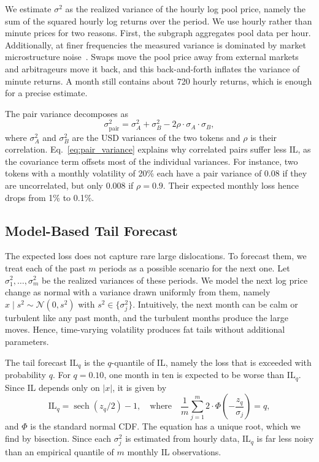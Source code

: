 \documentclass[10pt,conference,compsocconf]{IEEEtran}
\begin{document}
We estimate $\sigma^2$ as the realized variance of the hourly log pool price, namely the sum of the squared hourly log returns over the period. We use hourly rather than minute prices for two reasons. First, the subgraph aggregates pool data per hour. Additionally, at finer frequencies the measured variance is dominated by market microstructure noise~\cite{ait2005often}. Swaps move the pool price away from external markets and arbitrageurs move it back, and this back-and-forth inflates the variance of minute returns. A month still contains about 720 hourly returns, which is enough for a precise estimate.

The pair variance decomposes as
\begin{equation}
\label{eq:pair_variance}
\sigma^2_{\text{pair}} = \sigma_A^2 + \sigma_B^2 - 2\rho\cdot\sigma_A\cdot\sigma_B,
\end{equation}
where $\sigma_A^2$ and $\sigma_B^2$ are the USD variances of the two tokens and $\rho$ is their correlation. Eq.~\eqref{eq:pair_variance} explains why correlated pairs suffer less IL, as the covariance term offsets most of the individual variances. For instance, two tokens with a monthly volatility of 20\% each have a pair variance of 0.08 if they are uncorrelated, but only 0.008 if $\rho=0.9$. Their expected monthly loss hence drops from 1\% to 0.1\%.

\subsection{Model-Based Tail Forecast}
\label{subsec:model_tail}
The expected loss does not capture rare large dislocations. To forecast them, we treat each of the past $m$ periods as a possible scenario for the next one. Let $\sigma^2_1,\dots,\sigma^2_m$ be the realized variances of these periods. We model the next log price change as normal with a variance drawn uniformly from them, namely $x\mid s^2 \sim \mathcal{N}(0,s^2)$ with $s^2\in\{\sigma^2_j\}$. Intuitively, the next month can be calm or turbulent like any past month, and the turbulent months produce the large moves. Hence, time-varying volatility produces fat tails without additional parameters.

The tail forecast $\mathrm{IL}_q$ is the $q$-quantile of IL, namely the loss that is exceeded with probability $q$. For $q=0.10$, one month in ten is expected to be worse than $\mathrm{IL}_q$. Since IL depends only on $|x|$, it is given by
\begin{equation}
\label{eq:model_tail}
\mathrm{IL}_q = \operatorname{sech}(z_q/2)-1, \quad \text{where} \quad
\frac{1}{m}\sum_{j=1}^{m} 2\cdot\Phi\!\left(-\frac{z_q}{\sigma_j}\right) = q,
\end{equation}
and $\Phi$ is the standard normal CDF. The equation has a unique root, which we find by bisection. Since each $\sigma^2_j$ is estimated from hourly data, $\mathrm{IL}_q$ is far less noisy than an empirical quantile of $m$ monthly IL observations.
\end{document}
